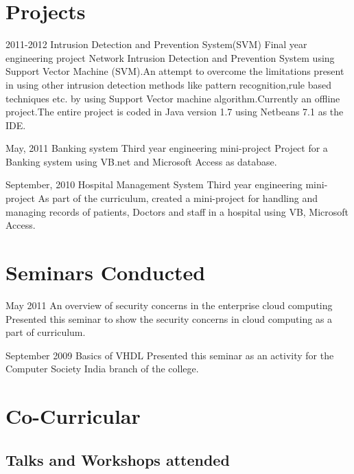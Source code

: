 \documentclass[11pt,a4paper]{moderncv}
\begin{document}

\section{Projects}
\cventry
{2011-2012}
{Intrusion Detection and Prevention System(SVM)}
{Final year engineering project}
{}
{}
{Network Intrusion Detection and Prevention System using
Support Vector Machine (SVM).An attempt to overcome the limitations present in using other intrusion detection methods like pattern recognition,rule based techniques etc. by using Support Vector machine algorithm.Currently an offline project.The entire project is coded in Java version 1.7 using Netbeans 7.1 as the IDE.
}


\cventry
{May, 2011}
{Banking system}
{Third year engineering mini-project}
{}
{}
{Project for a Banking system using VB.net and Microsoft Access as database.
}

\cventry
{September, 2010}
{Hospital Management System}
{Third year engineering mini-project}
{}
{}
{As part of the curriculum, created a mini-project for handling and managing records of patients, Doctors and staff in a hospital using VB, Microsoft Access. }

\newpage
\section{Seminars Conducted}



\cventry
{May 2011}
{An overview of security concerns in the enterprise cloud computing}
{}
{}
{}
{Presented this seminar to show the security concerns in cloud computing as a part of curriculum.}

\cventry
{September 2009}
{Basics of VHDL}
{}
{}
{}
{Presented this seminar as an activity for the Computer Society India branch of the college.}


\section{Co-Curricular}
\subsection{Talks and Workshops attended}
	
\end{document}
